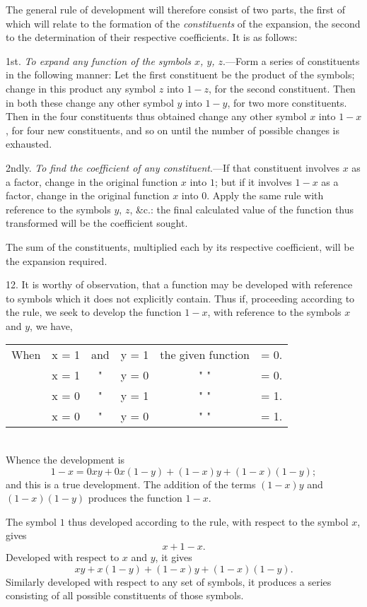 \documentclass[oneside]{book}
\begin{document}
The general rule of development will therefore consist of two
parts, the first of which will relate to the formation of the \textit{constituents}
of the expansion, the second to the determination of their
respective coefficients. It is as follows:

1st. \textit{To expand any function of the symbols $x$, $y$, $z$}.---Form a
series of constituents in the following manner: Let the first constituent
be the product of the symbols; change in this product
any symbol $z$ into $1 - z$, for the second constituent. Then in
both these change any other symbol $y$ into $1 - y$, for two more
constituents. Then in the four constituents thus obtained change
any other symbol $x$ into $1 - x$, for four new constituents, and so
on until the number of possible changes is exhausted.

2ndly. \textit{To find the coefficient of any constituent}.---If that constituent
involves $x$ as a factor, change in the original function $x$
into $1$; but if it involves $1 - x$ as a factor, change in the original
function $x$ into $0$. Apply the same rule with reference to the
symbols $y$, $z$, \&c.: the final calculated value of the function thus
transformed will be the coefficient sought.

The sum of the constituents, multiplied each by its respective
coefficient, will be the expansion required.

12. It is worthy of observation, that a function may be developed
with reference to symbols which it does not explicitly
contain. Thus if, proceeding according to the rule, we seek to
develop the function $1-x$, with reference to the symbols $x$ and
$y$, we have,

\begin{tabular}{c l c l c l}
\textrm{When } &x = 1 &\textrm{ and } &y = 1  &\textrm{ the given function }  &= 0.\\
             &x = 1  &"  &y = 0   &"  "  &= 0.\\
             &x = 0  &"  &y = 1   &"  "  &= 1.\\
             &x = 0  &"  &y = 0   &"  "  &= 1.
\end{tabular}\\
Whence the development is
\[
1-x = 0xy + 0x\left(1-y\right)+\left(1-x\right)y+\left(1-x\right)\left(1-y\right);
\]
and this is a true development. The addition of the terms $\left(1-x\right)y$
and $\left(1-x\right)\left(1-y\right)$ produces the function $1-x$.

The symbol $1$ thus developed according to the rule, with respect
to the symbol $x$, gives
\[
x + 1 - x.
\]
Developed with respect to $x$ and $y$, it gives
\[
xy + x\left(1-y\right) + \left(1-x\right)y + \left(1-x\right) \left(1-y\right).
\]
Similarly developed with respect to any set of symbols, it produces
a series consisting of all possible constituents of those
symbols.
\end{document}

